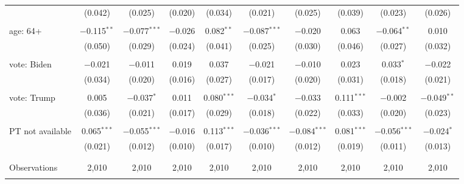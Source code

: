 \begin{tabular}{@{\extracolsep{5pt}}lccccccccc}
  & (0.042) & (0.025) & (0.020) & (0.034) & (0.021) & (0.025) & (0.039) & (0.023) & (0.026) \\ 
  & & & & & & & & & \\ 
 age: 64+ & $-$0.115$^{**}$ & $-$0.077$^{***}$ & $-$0.026 & 0.082$^{**}$ & $-$0.087$^{***}$ & $-$0.020 & 0.063 & $-$0.064$^{**}$ & 0.010 \\ 
  & (0.050) & (0.029) & (0.024) & (0.041) & (0.025) & (0.030) & (0.046) & (0.027) & (0.032) \\ 
  & & & & & & & & & \\ 
 vote: Biden & $-$0.021 & $-$0.011 & 0.019 & 0.037 & $-$0.021 & $-$0.010 & 0.023 & 0.033$^{*}$ & $-$0.022 \\ 
  & (0.034) & (0.020) & (0.016) & (0.027) & (0.017) & (0.020) & (0.031) & (0.018) & (0.021) \\ 
  & & & & & & & & & \\ 
 vote: Trump & 0.005 & $-$0.037$^{*}$ & 0.011 & 0.080$^{***}$ & $-$0.034$^{*}$ & $-$0.033 & 0.111$^{***}$ & $-$0.002 & $-$0.049$^{**}$ \\ 
  & (0.036) & (0.021) & (0.017) & (0.029) & (0.018) & (0.022) & (0.033) & (0.020) & (0.023) \\ 
  & & & & & & & & & \\ 
 PT not available & 0.065$^{***}$ & $-$0.055$^{***}$ & $-$0.016 & 0.113$^{***}$ & $-$0.036$^{***}$ & $-$0.084$^{***}$ & 0.081$^{***}$ & $-$0.056$^{***}$ & $-$0.024$^{*}$ \\ 
  & (0.021) & (0.012) & (0.010) & (0.017) & (0.010) & (0.012) & (0.019) & (0.011) & (0.013) \\ 
  & & & & & & & & & \\ 
\hline \\[-1.8ex] 

Observations & 2,010 & 2,010 & 2,010 & 2,010 & 2,010 & 2,010 & 2,010 & 2,010 & 2,010 \\ 
\hline 
\hline \\[-1.8ex] 
\end{tabular} 